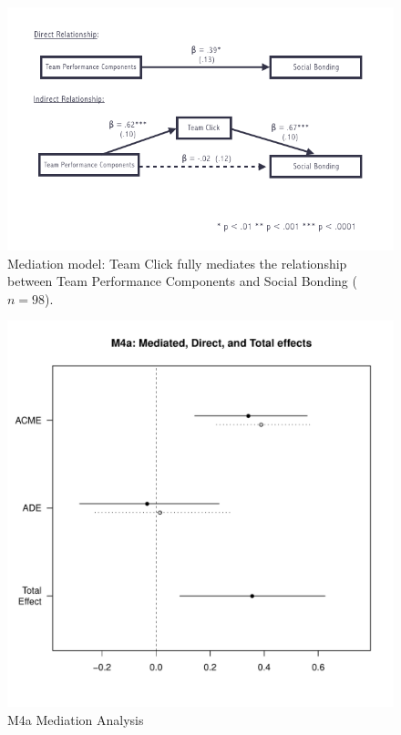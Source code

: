 \begin{CJK}{UTF8}{gbsn}

  \begin{figure}
    \centering
    \includegraphics[width=0.9\linewidth,keepaspectratio] {images/tournamentSurveyMediationFigure}
    \caption{Mediation model: Team Click fully mediates the relationship between Team Performance Components and Social Bonding ($n = 98$).}
    \label{fig:tournamentSurveyMediationFigure}
  \end{figure}


  \begin{figure}[htbp]
    \centering
    \includegraphics[scale = .5]{images/MLM4aMediationEffects.pdf}
    \caption{M4a Mediation Analysis}
    \label{fig:MLM4aMediationAnalysis}
  \end{figure}





\end{CJK}
